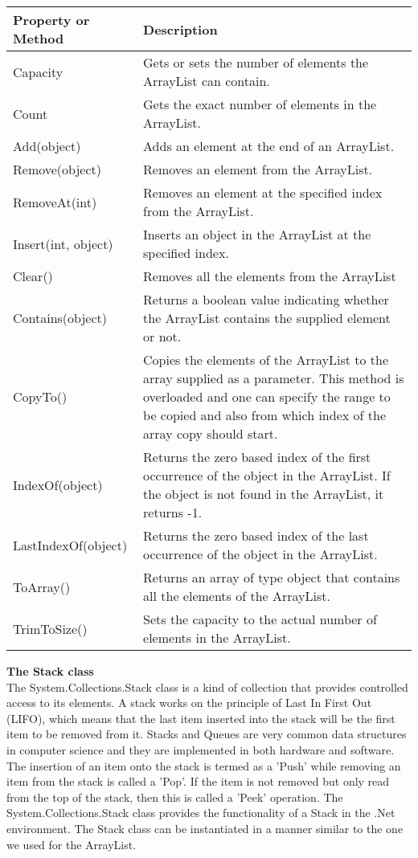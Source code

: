 \begin{center}
    \begin{tabular}{ | m{5em} | m{10cm} | } 
    \hline
    Property or Method & Description \\
    \hline
    Capacity & Gets or sets the number of elements the ArrayList can contain.\\
    Count & Gets the exact number of elements in the ArrayList.\\
    Add(object) & Adds an element at the end of an ArrayList.\\
    Remove(object) & Removes an element from the ArrayList.\\
    RemoveAt(int) & Removes an element at the specified index from the ArrayList.\\
    Insert(int, object) & Inserts an object in the ArrayList at the specified index.\\
    Clear() & Removes all the elements from the ArrayList\\
    Contains(object) & Returns a boolean value indicating whether the ArrayList contains the supplied
    element or not.\\
    CopyTo() & Copies the elements of the ArrayList to the array supplied as a parameter. This method
    is overloaded and one can specify the range to be copied and also from which index of
    the array copy should start.\\
    IndexOf(object) & Returns the zero based index of the first occurrence of the object in the ArrayList. If
    the object is not found in the ArrayList, it returns -1.\\
    LastIndexOf(object) & Returns the zero based index of the last occurrence of the object in the ArrayList.\\
    ToArray() & Returns an array of type object that contains all the elements of the ArrayList.\\
    TrimToSize() & Sets the capacity to the actual number of elements in the ArrayList.\\
    \hline
    \end{tabular}
\end{center}


\textbf{The Stack class}\\

The System.Collections.Stack class is a kind of collection that provides controlled access to its elements. A stack
works on the principle of Last In First Out (LIFO), which means that the last item inserted into the stack will be the
first item to be removed from it. Stacks and Queues are very common data structures in computer science and they
are implemented in both hardware and software. The insertion of an item onto the stack is termed as a ’Push’ while
removing an item from the stack is called a ’Pop’. If the item is not removed but only read from the top of the stack,
then this is called a ’Peek’ operation. The System.Collections.Stack class provides the functionality of a Stack in
the .Net environment. The Stack class can be instantiated in a manner similar to the one we used for the ArrayList.


